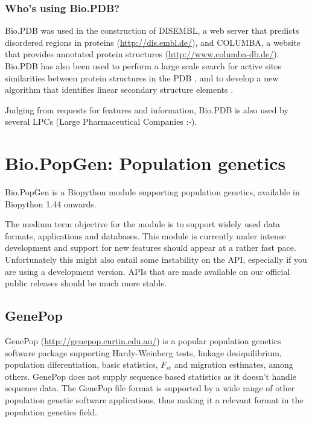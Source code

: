 \documentclass{report}
\begin{document}
\subsection{Who's using Bio.PDB?}

Bio.PDB was used in the construction of DISEMBL, a web server that
predicts disordered regions in proteins (\url{http://dis.embl.de/}),
and COLUMBA, a website that provides annotated protein structures
(\url{http://www.columba-db.de/}). Bio.PDB has also been used to
perform a large scale search for active sites similarities between
protein structures in the PDB \cite[Hamelryck, 2003]{hamelryck2003b}, and to develop a new algorithm
that identifies linear secondary structure elements \cite[Majumdar \textit{et al.}, 2005]{majumdar2005}.

Judging from requests for features and information, Bio.PDB is also
used by several LPCs (Large Pharmaceutical Companies :-).


\chapter{Bio.PopGen: Population genetics}

Bio.PopGen is a Biopython module supporting population genetics,
available in Biopython 1.44 onwards.

The medium term objective for the module is to support widely used data
formats, applications and databases. This module is currently under intense
development and support for new features should appear at a rather fast pace.
Unfortunately this might also entail some instability on the API, especially
if you are using a development version. APIs that are made available on
our official public releases should be much more stable.

\section{GenePop}

GenePop (\url{http://genepop.curtin.edu.au/}) is a popular population
genetics software package supporting Hardy-Weinberg tests, linkage
desiquilibrium, population diferentiation, basic statistics, $F_{st}$ and
migration estimates, among others. GenePop does not supply sequence
based statistics as it doesn't handle sequence data.
The GenePop file format is supported by a wide range of other population
genetic software applications, thus making it a relevant format in the
population genetics field.
\end{document}
